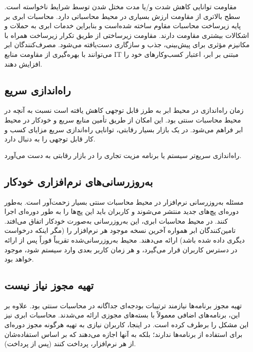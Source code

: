 \documentclass{book}
\begin{document}
        مقاومت توانایی کاهش شدت و/یا مدت مختل شدن توسط شرایط ناخواسته است. سطح بالاتری از مقاومت ارزش بسیاری در محیط محاسباتی دارد. محاسبات ابری بر پایه زیرساخت محاسبات مقاوم ساخته شده‌است و بنابراین خدمات ابری به حملات و اشکالات بیشتری مقاومت دارند. مقاومت زیرساختی از طریق تکرار زیرساخت همراه با مکانیزم مؤثری برای پیش‌بینی، جذب و سازگاری دست‌یافته می‌شود. مصرف‌کنندگان ابر می‌توانند با بهره‌گیری از مقاومت منابع IT مبتنی بر ابر، اعتبار کسب‌وکارهای خود را افزایش دهند.

    \subsection{راه‌اندازی سریع}

        زمان راه‌اندازی در محیط ابر به طرز قابل توجهی کاهش یافته است نسبت به آنچه در محیط محاسبات سنتی بود. این امکان از طریق تأمین منابع سریع و خودکار در محیط ابر فراهم می‌شود. در یک بازار بسیار رقابتی، توانایی راه‌اندازی سریع مزایای کسب و کار قابل توجهی را به دنبال دارد.

    \begin{addinfo}

        راه‌اندازی سریع‌تر سیستم یا برنامه مزیت تجاری را در بازار رقابتی به دست می‌آورد.

    \end{addinfo}

    \subsection{به‌روزرسانی‌های نرم‌افزاری خودکار}

        مسئله به‌روزرسانی نرم‌افزار در محیط محاسبات سنتی بسیار زحمت‌آور است. به‌طور دوره‌ای پچ‌های جدید منتشر می‌شوند و کاربران باید این پچ‌ها را به طور دوره‌ای اجرا کنند. در محیط محاسبات ابری، این به‌روزرسانی به‌صورت خودکار اتفاق می‌افتد. تامین‌کنندگان ابر همواره آخرین نسخه موجود هر نرم‌افزار را (مگر اینکه درخواست دیگری داده شده باشد) ارائه می‌دهند. محیط به‌روزرسانی‌شده تقریباً فوراً پس از ارائه در دسترس کاربران قرار می‌گیرد، و هر زمان کاربر بعدی وارد سیستم شود، موجود خواهد بود.

    \subsection{تهیه مجوز نیاز نیست}

        تهیه مجوز برنامه‌ها نیازمند ترتیبات بودجه‌ای جداگانه در محاسبات سنتی بود. علاوه بر این، برنامه‌های اضافی معمولاً با بسته‌های مجوزی ارائه می‌شدند. محاسبات ابری نیز این مشکل را برطرف کرده است. در اینجا، کاربران نیازی به تهیه هرگونه مجوز دوره‌ای برای استفاده از برنامه‌ها ندارند؛ بلکه به آنها اجازه می‌دهند که بر اساس استفاده‌شان از هر نرم‌افزار، پرداخت کنند (پس از پرداخت).
    
\end{document}
